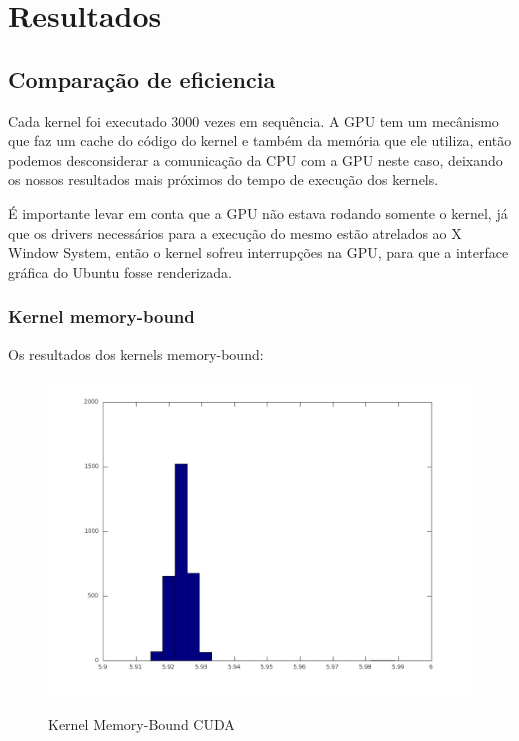 \section{Resultados}
\subsection{Comparação de eficiencia}
Cada kernel foi executado 3000 vezes em sequência. A GPU tem um mecânismo que faz um cache do código do kernel e também
da memória que ele utiliza, então podemos desconsiderar a comunicação da CPU com a GPU neste caso, deixando os nossos resultados 
mais próximos do tempo de execução dos kernels.

É importante levar em conta que a GPU não estava rodando somente o kernel, já que os drivers necessários para a execução 
do mesmo estão atrelados ao X Window System, então o kernel sofreu interrupções na GPU, para que a interface gráfica do 
Ubuntu fosse renderizada.

\subsubsection{Kernel memory-bound}
Os resultados dos kernels memory-bound:

\begin{figure}[H]
  \begin{center}
    \includegraphics[scale=0.3]{resultados_cuda_memory_histo.jpg}
    \label{fig:Kernel Memory-Bound CUDA}
    \caption{Kernel Memory-Bound CUDA}
  \end{center}
\end{figure}

